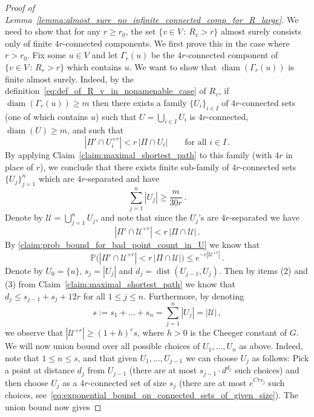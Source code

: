 \documentclass[11pt, reqno]{article}
\numberwithin{equation}{section}
\theoremstyle{definition}
\def\cU{\mathcal{U}}
\def\P{\mathbb{P}}
\newcommand{\1}{\mathds{1}}
\DeclareMathOperator{\dist}{dist}
\DeclareMathOperator{\diam}{diam}
\begin{document}
\begin{proof}[Proof of Lemma~\ref{lemma:almost_sure_no_infinite_connected_comp_for_R_large}]
    We need to show that for any $r \ge r_0$, the set $\{v\in V\, : \, R_v > r\}$ almost surely consists only of finite $4r$-connected components.
    We first prove this in the case where $r>r_0$. Fix some $u\in V$ and let $\Gamma_r(u)$ be the $4r$-connected component of $\{v\in V \, : \, R_{v} > r\}$ which contains $u$. We want to show that $\diam(\Gamma_r(u))$ is finite almost surely. Indeed, by the definition~\eqref{eq:def_of_R_v_in_nonamenable_case} of $R_v$, if $\diam(\Gamma_r(u))\ge m$ then there exists a family $\{U_i\}_{i\in I}$ of $4r$-connected sets (one of which contains $u$) such that $U=\bigcup_{i\in I} U_i$ is $4r$-connected, $\diam(U)\ge m$, and such that
    \[
    |\Pi' \cap U_i^{+r} |  < r \, |\Pi \cap U_i| \qquad \text{for all } i\in I\, .
    \]
    By applying Claim~\ref{claim:maximal_shortest_path} to this family (with $4r$ in place of $r$), we conclude that there exists finite sub-family of $4r$-connected sets $\{U_{j}\}_{j=1}^{n}$ which are $4r$-separated and have
    \[
    \sum_{j=1}^{n} |U_j| \ge \frac{m}{30r} \, .
    \]
    Denote by $\cU = \bigcup_{j=1}^{n} U_j$, and note that since the $U_j$'s are $4r$-separated we have
    \begin{equation}        \label{eq:proof_of_lemma_almost_sure_no_infinite_connected_comp_for_R_large_deficiency_of_random_points}
        |\Pi' \cap  \cU^{+r} | < r \, |\Pi \cap \cU| \, .
        \end{equation}
    By \cref{claim:prob_bound_for_bad_point_count_in_U} we know that
    \[
    \P\big(|\Pi' \cap \cU^{+r} | < r \, |\Pi \cap \cU|\big) \le e^{-c |\cU^{+r}|} \, .
    \]
    Denote by $U_0 = \{u\}$, $s_j = |U_j|$ and $d_j = \dist(U_{j-1},U_j)$. Then by items (2) and (3) from Claim~\ref{claim:maximal_shortest_path} we know that $d_j \le s_{j-1} + s_j + 12r$ for all $1\le j \le n$. Furthermore, by denoting
    \[
    s := s_1+\ldots + s_n = \sum_{j=1}^{n}|U_j| = |\mathcal{U}| \, ,
    \]
    we observe that $|\mathcal{U}^{+r}| \ge (1+h)^{r} s$, where $h>0$ is the Cheeger constant of $G$. We will now union bound over all possible choices of $U_1,\ldots,U_n$ as above. Indeed, note that $1\le n\le s$, and that given $U_1,\ldots,U_{j-1}$ we can choose $U_j$ as follows: Pick a point at distance $d_j$ from $U_{j-1}$ (there are at most $s_{j-1} \cdot d^{d_j}$ such choices) and then choose $U_j$ as a $4r$-connected set of size $s_j$ (there are at most $e^{Crs_j}$ such choices, see~\eqref{eq:exponential_bound_on_connected_sets_of_given_size}). The union bound now gives

\end{proof}
\end{document}
